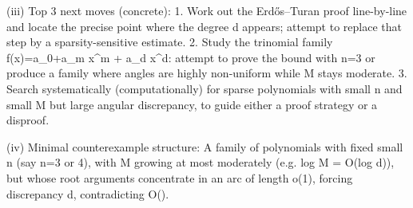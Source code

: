 (iii) Top 3 next moves (concrete):
    1. Work out the Erd\H{o}s--Turan proof line-by-line and locate the precise point where the
       degree d appears; attempt to replace that step by a sparsity-sensitive estimate.
    2. Study the trinomial family f(x)=a_0+a_m x^m + a_d x^d: attempt to prove the bound with
       n=3 or produce a family where angles are highly non-uniform while M stays moderate.
    3. Search systematically (computationally) for sparse polynomials with small n and small
       M but large angular discrepancy, to guide either a proof strategy or a disproof.

(iv) Minimal counterexample structure:
    A family of polynomials with fixed small n (say n=3 or 4), with M growing at most
    moderately (e.g. log M = O(log d)), but whose root arguments concentrate in an arc of
    length o(1), forcing discrepancy \gg d, contradicting O().


